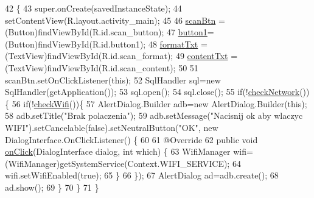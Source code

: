 \begin{DoxyCode}
42                                                        \{
43         super.onCreate(savedInstanceState);
44         setContentView(R.layout.activity\_main);
45         
46         \hyperlink{classcom_1_1example_1_1qrpoll_1_1_main_activity_a24aa61710d9b421c0d23ab545b4f8b99}{scanBtn} = (Button)findViewById(R.id.scan\_button);
47         \hyperlink{classcom_1_1example_1_1qrpoll_1_1_main_activity_a3c62b040921525ab5c9944e97e08f639}{button1}=(Button)findViewById(R.id.button1);
48         \hyperlink{classcom_1_1example_1_1qrpoll_1_1_main_activity_ac2f96df8bbad653bdd8630d749a23ddc}{formatTxt} = (TextView)findViewById(R.id.scan\_format);
49         \hyperlink{classcom_1_1example_1_1qrpoll_1_1_main_activity_aee6c7adea75224ec647353db3ca58124}{contentTxt} = (TextView)findViewById(R.id.scan\_content);
50         
51         scanBtn.setOnClickListener(\textcolor{keyword}{this});
52         SqlHandler sql=\textcolor{keyword}{new} SqlHandler(getApplication());
53         sql.open();
54         sql.close();
55         \textcolor{keywordflow}{if}(!\hyperlink{classcom_1_1example_1_1qrpoll_1_1_main_activity_af92255e3a196405eeb55e06bb625d435}{checkNetwork}())\{
56             \textcolor{keywordflow}{if}(!\hyperlink{classcom_1_1example_1_1qrpoll_1_1_main_activity_a0433b5df97dcca7db8593f32d8d033b9}{checkWifi}())\{
57                 AlertDialog.Builder adb=\textcolor{keyword}{new} AlertDialog.Builder(\textcolor{keyword}{this});
58                 adb.setTitle(\textcolor{stringliteral}{"Brak polaczenia"});
59                 adb.setMessage(\textcolor{stringliteral}{"Nacisnij ok aby wlaczyc WIFI"}).setCancelable(\textcolor{keyword}{false}).setNeutralButton(\textcolor{stringliteral}{"OK"}, \textcolor{keyword}{
      new} DialogInterface.OnClickListener() \{
60                     
61                     @Override
62                     \textcolor{keyword}{public} \textcolor{keywordtype}{void} \hyperlink{classcom_1_1example_1_1qrpoll_1_1_main_activity_a400e30efc907d9726298482730d4243d}{onClick}(DialogInterface dialog, \textcolor{keywordtype}{int} which) \{
63                         WifiManager wifi=(WifiManager)getSystemService(Context.WIFI\_SERVICE);
64                         wifi.setWifiEnabled(\textcolor{keyword}{true});
65                     \}
66                 \});
67                 AlertDialog ad=adb.create();
68                 ad.show();
69             \}
70         \}
71     \}
\end{DoxyCode}
